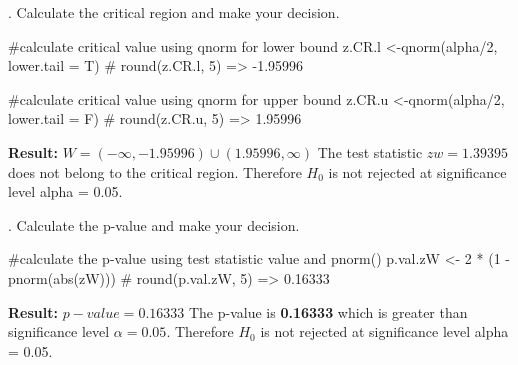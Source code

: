 \documentclass[12pt, oneside]{report}\usepackage[]{graphicx}\usepackage[]{color}
\begin{document}
. Calculate the critical region and make your decision.
\begin{Schunk}
\begin{Sinput}
#calculate critical value using qnorm for lower bound
z.CR.l <-qnorm(alpha/2, lower.tail = T)
# round(z.CR.l, 5) => -1.95996

#calculate critical value using qnorm for upper bound
z.CR.u <-qnorm(alpha/2, lower.tail = F)
# round(z.CR.u, 5) => 1.95996
\end{Sinput}
\end{Schunk}
{\bf Result:} $W = (-\infty, -1.95996) \cup (1.95996, \infty) $ \newline
The test statistic $zw = 1.39395$ does not belong to the critical region. Therefore $H_0$ is not rejected at significance level alpha = 0.05. \newline

. Calculate the p-value and make your decision.
\begin{Schunk}
\begin{Sinput}
#calculate the p-value using test statistic value and pnorm()
p.val.zW <- 2 * (1 - pnorm(abs(zW)))
# round(p.val.zW, 5) => 0.16333
\end{Sinput}
\end{Schunk}
{\bf Result:} $p-value = 0.16333$ \newline
The p-value is {\bf 0.16333} which is greater than significance level $\alpha = 0.05$. Therefore $H_0$ is not rejected at significance level alpha = 0.05. \newline
\end{document}

